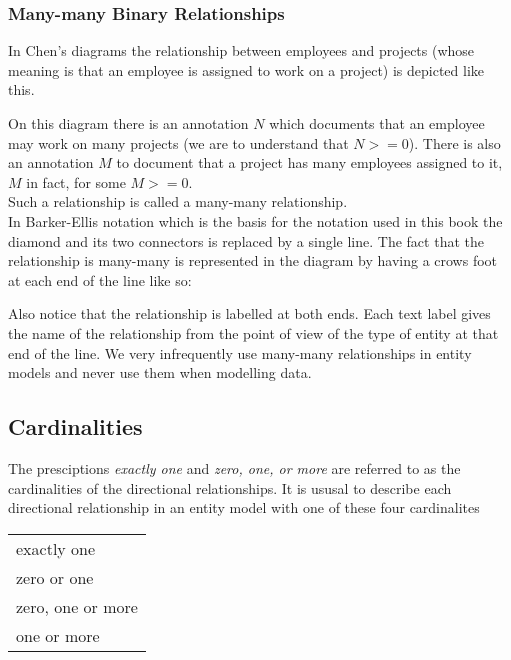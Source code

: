 \subsubsection*{Many-many Binary Relationships}
In Chen's diagrams the relationship between employees and projects (whose meaning is that
an employee is assigned to work on a project) is depicted like this.
\begin{center}

\end{center}
On this diagram there is an annotation $N$ which documents that an employee may work on many projects (we are to understand that $N >= 0$). There is also an annotation $M$ to document that
a project has many employees assigned to it, $M$ in fact, for some $M >= 0$. \\
\noindent Such a relationship is called a many-many relationship.  \\
\noindent In Barker-Ellis notation which is the basis for the notation used in this book the diamond and its two connectors is replaced by a single line. The fact that the relationship is many-many is represented in the diagram by having a crows foot at each end of the line like so:

\begin{center}

\end{center}

\noindent Also notice that the relationship is labelled at both ends. Each text label gives the name of the relationship from the point of view of the type of entity at that end of the line.
\noindent We very infrequently use many-many relationships in entity models and never use them when modelling data.


\subsection{Cardinalities}
The presciptions \textit{exactly one} and \textit{zero, one, or more} are referred to as the cardinalities of the directional relationships. It is ususal to describe each directional relationship in an entity model  with one of these four cardinalites
\begin{center}
\begin{tabular} {l}
exactly one \\
zero or one \\
zero, one or more\\
one or more \\
\end{tabular}
\end{center}


